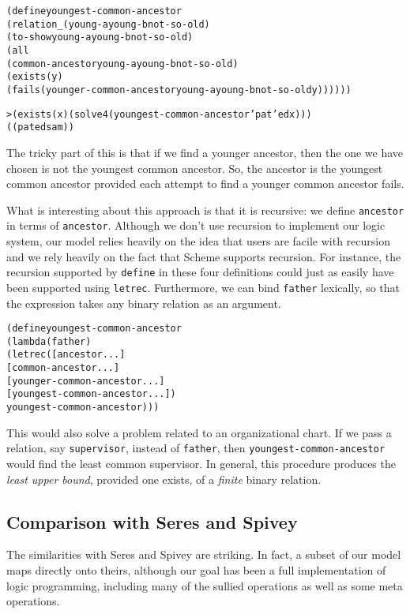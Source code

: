 \begin{alltt}
(define youngest-common-ancestor
  (relation _ (young-a young-b not-so-old)
    (to-show young-a young-b not-so-old)
    (all
      (common-ancestor young-a young-b not-so-old)
      (exists (y)
        (fails (younger-common-ancestor young-a young-b not-so-old y))))))

> (exists (x) (solve 4 (youngest-common-ancestor 'pat 'ed x)))
((pat ed sam))
\end{alltt}

\noindent
The tricky part of this is that if we find a younger ancestor,
then the one we have chosen is not the youngest common ancestor.  So, the
ancestor is the youngest common ancestor provided each attempt to find
a younger common ancestor fails.

What is interesting about this approach is that it is recursive: we
define \texttt{ancestor} in terms of \texttt{ancestor}.  Although
we don't use recursion to implement our logic system, our model
relies heavily on the idea that users are facile with recursion
and we rely heavily on the fact that Scheme supports recursion.  For
instance, the recursion supported by \texttt{define} in these four
definitions could just as easily have been supported using
\texttt{letrec}.  Furthermore, we can bind \texttt{father} lexically,
so that the expression takes any binary relation as an argument.

\begin{alltt}
(define youngest-common-ancestor
  (lambda (father)
    (letrec ([ancestor ...]
             [common-ancestor ...]
             [younger-common-ancestor ...]
             [youngest-common-ancestor ...])
      youngest-common-ancestor)))
\end{alltt}  

\noindent
This would also solve a problem related to an organizational chart.
If we pass a relation, say \texttt{supervisor}, instead of
\texttt{father}, then \texttt{youngest-common-ancestor} would find the
least common supervisor.  In general, this procedure produces the
\emph{least upper bound}, provided one exists, of a \emph{finite}
binary relation.

\subsection{Comparison with Seres and Spivey}
The similarities with Seres and Spivey are striking.  In fact, a
subset of our model maps directly onto theirs, although our goal
has been a full implementation of logic programming, including
many of the sullied operations as well as some meta operations.

